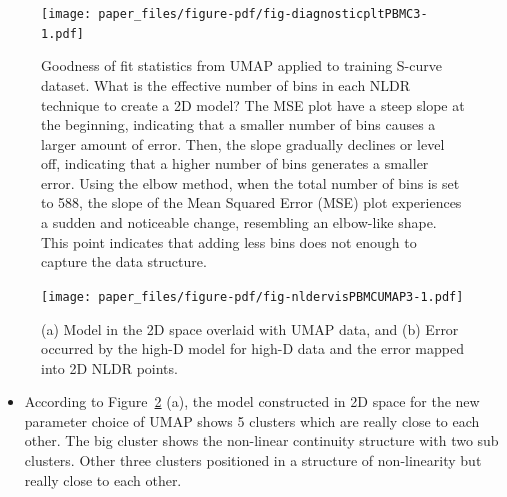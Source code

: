 \documentclass[
  12pt]{article}
\providecommand{\tightlist}{%
  \setlength{\itemsep}{0pt}\setlength{\parskip}{0pt}}\usepackage{longtable,booktabs,array}
\begin{document}
\begin{figure}

{\centering \texttt{[image: paper\_files/figure-pdf/fig-diagnosticpltPBMC3-1.pdf]}

}

\caption{\label{fig-diagnosticpltPBMC3}Goodness of fit statistics from
UMAP applied to training S-curve dataset. What is the effective number
of bins in each NLDR technique to create a 2D model? The MSE plot have a
steep slope at the beginning, indicating that a smaller number of bins
causes a larger amount of error. Then, the slope gradually declines or
level off, indicating that a higher number of bins generates a smaller
error. Using the elbow method, when the total number of bins is set to
588, the slope of the Mean Squared Error (MSE) plot experiences a sudden
and noticeable change, resembling an elbow-like shape. This point
indicates that adding less bins does not enough to capture the data
structure.}

\end{figure}

\begin{figure}[H]

{\centering \texttt{[image: paper\_files/figure-pdf/fig-nldervisPBMCUMAP3-1.pdf]}

}

\caption{\label{fig-nldervisPBMCUMAP3}(a) Model in the 2D space overlaid
with UMAP data, and (b) Error occurred by the high-D model for high-D
data and the error mapped into 2D NLDR points.}

\end{figure}

\begin{itemize}
\tightlist
\item
  According to Figure~\ref{fig-nldervisPBMCUMAP3} (a), the model
  constructed in 2D space for the new parameter choice of UMAP shows 5
  clusters which are really close to each other. The big cluster shows
  the non-linear continuity structure with two sub clusters. Other three
  clusters positioned in a structure of non-linearity but really close
  to each other.
\end{itemize}
\end{document}
